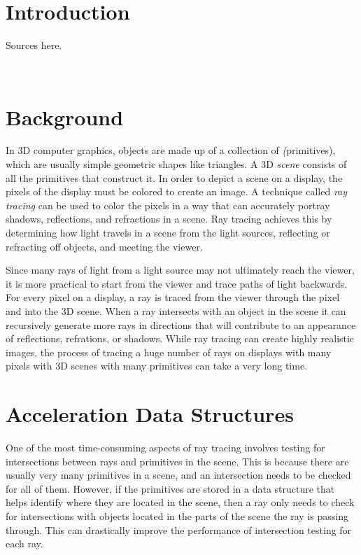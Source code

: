 \documentclass{sig-alternate}
\begin{document}


\section{Introduction}
\label{sec:introduction}

Sources here.

~\cite{Karras:2013}
~\cite{Garanzha:2011}


\section{Background}
\label{sec:background}
In 3D computer graphics, objects are made up of a collection of \emph(primitives), which are usually simple geometric shapes like triangles. A 3D \emph{scene} consists of all the primitives that construct it. In order to depict a scene on a display, the pixels of the display must be colored to create an image. A technique called \emph{ray tracing} can be used to color the pixels in a way that can accurately portray shadows, reflections, and refractions in a scene. Ray tracing achieves this by determining how light travels in a scene from the light sources, reflecting or refracting off objects, and meeting the viewer.

Since many rays of light from a light source may not ultimately reach the viewer, it is more practical to start from the viewer and trace paths of light backwards. For every pixel on a display, a ray is traced from the viewer through the pixel and into the 3D scene. When a ray intersects with an object in the scene it can recursively generate more rays in directions that will contribute to an appearance of reflections, refrations, or shadows. While ray tracing can create highly realistic images, the process of tracing a huge number of rays on displays with many pixels with 3D scenes with many primitives can take a very long time.


\section{Acceleration Data Structures}
\label{sec:body}

One of the most time-consuming aspects of ray tracing involves testing for intersections between rays and primitives in the scene. This is because there are usually very many primitives in a scene, and an intersection needs to be checked for all of them. However, if the primitives are stored in a data structure that helps identify where they are located in the scene, then a ray only needs to check for intersections with objects located in the parts of the scene the ray is passing through. This can drastically improve the performance of intersection testing for each ray.
\end{document}
